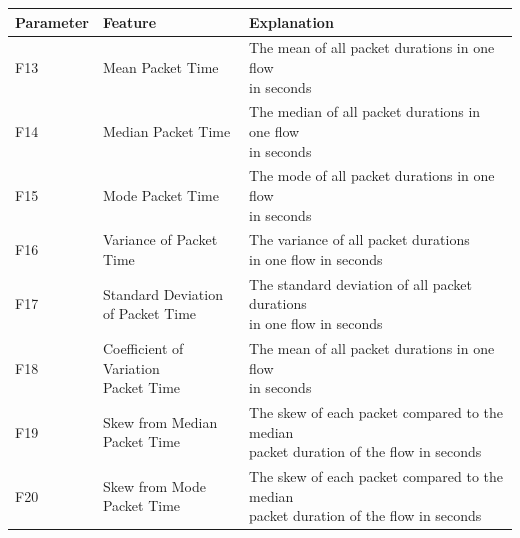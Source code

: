 \begin{center}
\begin{longtable}{ |l|l|l| }
\hline
Parameter & Feature & Explanation \\
\hline
F13 & Mean Packet Time & \makecell{The mean of all packet durations in one flow \\ in seconds} \\
\hline
F14 & Median Packet Time & \makecell{The median of all packet durations in one flow \\ in seconds} \\
\hline
F15 & Mode Packet Time & \makecell{The mode of all packet durations in one flow \\ in seconds} \\
\hline
F16 & Variance of Packet Time & \makecell{The variance of all packet durations \\ in one flow in seconds} \\
\hline
F17 & \makecell{Standard Deviation \\ of Packet Time} & \makecell{The standard deviation of all packet durations \\ in one flow in seconds} \\
\hline
F18 & \makecell{Coefficient of Variation \\ Packet Time} & \makecell{The mean of all packet durations in one flow \\ in seconds} \\
\hline
F19 & \makecell{Skew from Median \\ Packet Time} & \makecell{The skew of each packet compared to the median \\ packet duration of the flow in seconds} \\
\hline
F20 & \makecell{Skew from Mode \\ Packet Time} & \makecell{The skew of each packet compared to the median \\ packet duration of the flow in seconds} \\
\hline
\end{longtable}
 \label{tab:packetTime}
\end{center}


